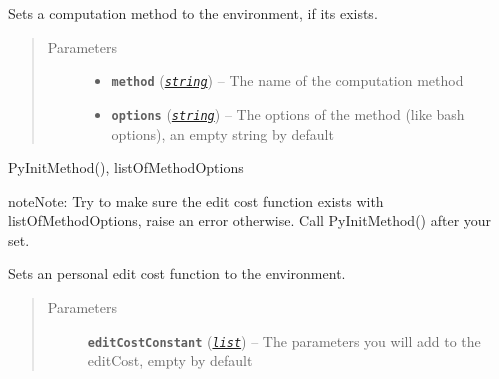 \documentclass[letterpaper,10pt,english]{sphinxmanual}
\begin{document}
\begin{fulllineitems}
\label{doc:PythonGedLib.PySetMethod}
Sets a computation method to the environment, if its exists.
\begin{quote}\begin{description}
\item[{Parameters}] \leavevmode\begin{itemize}
\item {} 
\textbf{\texttt{method}} (\href{https://docs.python.org/3/library/string.html\#module-string}{\emph{\texttt{string}}}) -- The name of the computation method

\item {} 
\textbf{\texttt{options}} (\href{https://docs.python.org/3/library/string.html\#module-string}{\emph{\texttt{string}}}) -- The options of the method (like bash options), an empty string by default

\end{itemize}

\end{description}\end{quote}




PyInitMethod(), listOfMethodOptions



\begin{notice}{note}{Note:}
Try to make sure the edit cost function exists with listOfMethodOptions, raise an error otherwise. Call PyInitMethod() after your set.
\end{notice}

\end{fulllineitems}


\begin{fulllineitems}
\label{doc:PythonGedLib.PySetPersonalEditCost}
Sets an personal edit cost function to the environment.
\begin{quote}\begin{description}
\item[{Parameters}] \leavevmode
\textbf{\texttt{editCostConstant}} (\href{https://docs.python.org/3/library/stdtypes.html\#list}{\emph{\texttt{list}}}) -- The parameters you will add to the editCost, empty by default

\end{description}\end{quote}

\end{fulllineitems}
\end{document}
